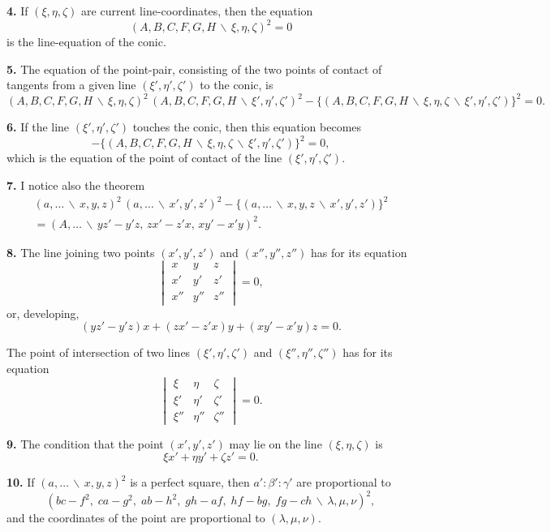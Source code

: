 \documentclass[11pt,a4paper]{article}
\theoremstyle{definition}
\begin{document}
\textbf{4.} If $(\xi,\eta,\zeta)$ are current line-coordinates, then the equation
\[(A,B,C,F,G,H\,\backslash\!\!\,\xi,\eta,\zeta)^{2} = 0\]
is the line-equation of the conic.

\textbf{5.} The equation of the point-pair, consisting of the two points of contact of
tangents from a given line $(\xi',\eta',\zeta')$ to the conic, is
\[(A,B,C,F,G,H\,\backslash\!\!\,\xi,\eta,\zeta)^{2}\,(A,B,C,F,G,H\,\backslash\!\!\,\xi',\eta',\zeta')^{2}
- \{(A,B,C,F,G,H\,\backslash\!\!\,\xi,\eta,\zeta\,\backslash\!\!\,\xi',\eta',\zeta')\}^{2} = 0.\]

\textbf{6.} If the line $(\xi',\eta',\zeta')$ touches the conic, then this equation becomes
\[-\{(A,B,C,F,G,H\,\backslash\!\!\,\xi,\eta,\zeta\,\backslash\!\!\,\xi',\eta',\zeta')\}^{2} = 0,\]
which is the equation of the point of contact of the line $(\xi',\eta',\zeta')$.

\newpage

\textbf{7.} I notice also the theorem
\begin{multline*}
(a,\ldots\,\backslash\!\!\,x,y,z)^{2}\,(a,\ldots\,\backslash\!\!\,x',y',z')^{2}
- \{(a,\ldots\,\backslash\!\!\,x,y,z\,\backslash\!\!\,x',y',z')\}^{2} \\
= (A,\ldots\,\backslash\!\!\,yz'-y'z,\, zx'-z'x,\, xy'-x'y)^{2}.
\end{multline*}

\textbf{8.} The line joining two points $(x',y',z')$ and $(x'',y'',z'')$ has for its equation
\[
\begin{vmatrix}
x & y & z \\
x' & y' & z' \\
x'' & y'' & z''
\end{vmatrix}
= 0,\]
or, developing,
\[(yz'-y'z)x + (zx'-z'x)y + (xy'-x'y)z = 0.\]

The point of intersection of two lines $(\xi',\eta',\zeta')$ and $(\xi'',\eta'',\zeta'')$ has
for its equation
\[
\begin{vmatrix}
\xi & \eta & \zeta \\
\xi' & \eta' & \zeta' \\
\xi'' & \eta'' & \zeta''
\end{vmatrix}
= 0.\]

\textbf{9.} The condition that the point $(x',y',z')$ may lie on the line $(\xi,\eta,\zeta)$ is
\[\xi x' + \eta y' + \zeta z' = 0.\]

\textbf{10.} If $(a,\ldots\,\backslash\!\!\,x,y,z)^{2}$ is a perfect square, then
$a':\beta':\gamma'$ are proportional to
\[(bc-f^{2},\; ca-g^{2},\; ab-h^{2},\; gh-af,\; hf-bg,\; fg-ch\,\backslash\!\!\,\lambda,\mu,\nu)^{2},\]
and the coordinates of the point are proportional to $(\lambda,\mu,\nu)$.
\end{document}
